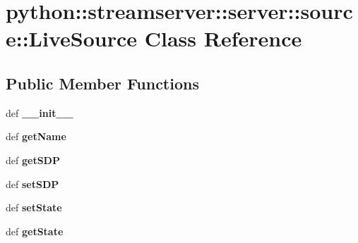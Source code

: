 \hypertarget{classpython_1_1streamserver_1_1server_1_1source_1_1LiveSource}{
\section{python::streamserver::server::source::LiveSource Class Reference}
\label{classpython_1_1streamserver_1_1server_1_1source_1_1LiveSource}
}
\subsection*{Public Member Functions}
\begin{DoxyCompactItemize}
\item 
\hypertarget{classpython_1_1streamserver_1_1server_1_1source_1_1LiveSource_a3113b53aec3915a8a76a985843a39471}{
def {\bfseries \_\-\_\-init\_\-\_\-}}
\label{classpython_1_1streamserver_1_1server_1_1source_1_1LiveSource_a3113b53aec3915a8a76a985843a39471}

\item 
\hypertarget{classpython_1_1streamserver_1_1server_1_1source_1_1LiveSource_abe5c08b4ebb2ae07b7affbc054d31d7f}{
def {\bfseries getName}}
\label{classpython_1_1streamserver_1_1server_1_1source_1_1LiveSource_abe5c08b4ebb2ae07b7affbc054d31d7f}

\item 
\hypertarget{classpython_1_1streamserver_1_1server_1_1source_1_1LiveSource_aa8bcdf70f7f25a5192c49a43aef92095}{
def {\bfseries getSDP}}
\label{classpython_1_1streamserver_1_1server_1_1source_1_1LiveSource_aa8bcdf70f7f25a5192c49a43aef92095}

\item 
\hypertarget{classpython_1_1streamserver_1_1server_1_1source_1_1LiveSource_abc14e1ea625fde206b1e318991a68ee8}{
def {\bfseries setSDP}}
\label{classpython_1_1streamserver_1_1server_1_1source_1_1LiveSource_abc14e1ea625fde206b1e318991a68ee8}

\item 
\hypertarget{classpython_1_1streamserver_1_1server_1_1source_1_1LiveSource_ac4bf895acd0df37b088001cfb524b736}{
def {\bfseries setState}}
\label{classpython_1_1streamserver_1_1server_1_1source_1_1LiveSource_ac4bf895acd0df37b088001cfb524b736}

\item 
\hypertarget{classpython_1_1streamserver_1_1server_1_1source_1_1LiveSource_af9925d56c5c11dc853e144a5d5a12806}{
def {\bfseries getState}}
\label{classpython_1_1streamserver_1_1server_1_1source_1_1LiveSource_af9925d56c5c11dc853e144a5d5a12806}


\end{DoxyCompactItemize}
